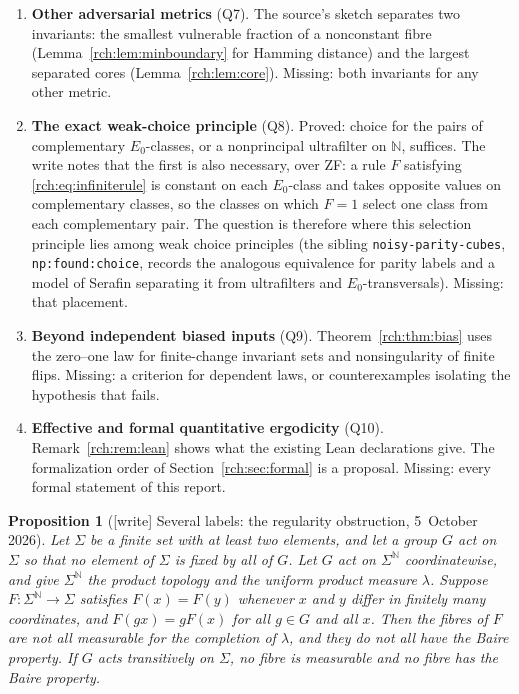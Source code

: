 \documentclass[11pt]{article}
\newtheorem{proposition}[theorem]{Proposition}
\theoremstyle{definition}
\theoremstyle{remark}
\newcommand{\N}{\mathbb N}
\newcommand{\file}[1]{\nolinkurl{#1}}
\begin{document}
\begin{enumerate}[leftmargin=*,label=\textbf{\arabic*.},ref=\arabic*]
\item\label{rch:q:metrics} \textbf{Other adversarial metrics} (Q7). The
 source's sketch separates two invariants: the smallest vulnerable fraction
 of a nonconstant fibre (Lemma~\ref{rch:lem:minboundary} for Hamming
 distance) and the largest separated cores (Lemma~\ref{rch:lem:core}).
 Missing: both invariants for any other metric.
\item\label{rch:q:weakchoice} \textbf{The exact weak-choice principle} (Q8).
 Proved: choice for the pairs of complementary $E_0$-classes, or a
 nonprincipal ultrafilter on $\N$, suffices. The write notes that the first
 is also necessary, over ZF: a rule $F$ satisfying
 \eqref{rch:eq:infiniterule} is constant on each $E_0$-class and takes
 opposite values on complementary classes, so the classes on which $F=1$
 select one class from each complementary pair. The question is therefore
 where this selection principle lies among weak choice principles (the
 sibling \file{noisy-parity-cubes}, \file{np:found:choice}, records the
 analogous equivalence for parity labels and a model of Serafin separating
 it from ultrafilters and $E_0$-transversals). Missing: that placement.
\item\label{rch:q:dependent} \textbf{Beyond independent biased inputs} (Q9).
 Theorem~\ref{rch:thm:bias} uses the zero--one law for finite-change
 invariant sets and nonsingularity of finite flips. Missing: a criterion for
 dependent laws, or counterexamples isolating the hypothesis that fails.
\item\label{rch:q:formal} \textbf{Effective and formal quantitative
 ergodicity} (Q10). Remark~\ref{rch:rem:lean} shows what the existing Lean
 declarations give. The formalization order of Section~\ref{rch:sec:formal}
 is a proposal. Missing: every formal statement of this report.
\end{enumerate}

\begin{proposition}[{[write]} Several labels: the regularity obstruction, 5~October 2026]
\label{rch:prop:alphabet}
Let $\Sigma$ be a finite set with at least two elements, and let a group
$G$ act on $\Sigma$ so that no element of $\Sigma$ is fixed by all of $G$.
Let $G$ act on $\Sigma^{\N}$ coordinatewise, and give $\Sigma^{\N}$ the
product topology and the uniform product measure $\lambda$. Suppose
$F:\Sigma^{\N}\to\Sigma$ satisfies $F(x)=F(y)$ whenever $x$ and $y$ differ
in finitely many coordinates, and $F(gx)=gF(x)$ for all $g\in G$ and all
$x$. Then the fibres of $F$ are not all measurable for the completion of
$\lambda$, and they do not all have the Baire property. If $G$ acts
transitively on $\Sigma$, no fibre is measurable and no fibre has the Baire
property.
\end{proposition}
\end{document}
